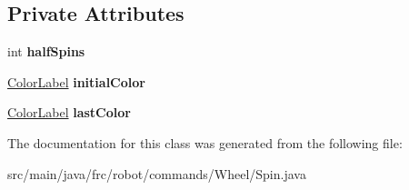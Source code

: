 \subsection*{Private Attributes}
\begin{DoxyCompactItemize}
\item 
\mbox{\label{classfrc_1_1robot_1_1commands_1_1_wheel_1_1_spin_af2e694b3f4a695ccf728f29cda8a08e1}} 
int {\bfseries half\+Spins}
\item 
\mbox{\label{classfrc_1_1robot_1_1commands_1_1_wheel_1_1_spin_abe3027e8a8402123f6bbc784a4dcb450}} 
\mbox{\hyperlink{enumfrc_1_1robot_1_1enums_1_1_color_label}{Color\+Label}} {\bfseries initial\+Color}
\item 
\mbox{\label{classfrc_1_1robot_1_1commands_1_1_wheel_1_1_spin_a83ffd58b97510db8ff59b65fd1df4b13}} 
\mbox{\hyperlink{enumfrc_1_1robot_1_1enums_1_1_color_label}{Color\+Label}} {\bfseries last\+Color}
\end{DoxyCompactItemize}


The documentation for this class was generated from the following file\+:\begin{DoxyCompactItemize}
\item 
src/main/java/frc/robot/commands/\+Wheel/Spin.\+java\end{DoxyCompactItemize}
